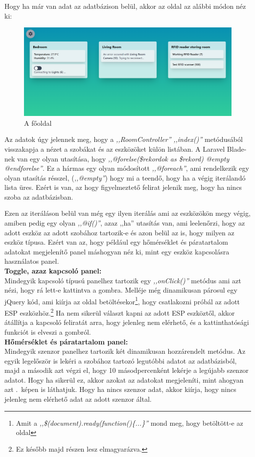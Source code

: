\documentclass[
]{thesis-ekf}
\theoremstyle{definition}
\theoremstyle{remark}
\begin{document}
	Hogy ha már van adat az adatbázison belül, akkor az oldal az alábbi módon néz ki:
	\begin{figure}[ht!]
		\centering
		\includegraphics[width=1\textwidth]{./src/pages_img/index}
		\caption{A főoldal}
		\label{index-page}
	\end{figure}	

	Az adatok úgy jelennek meg, hogy a \emph{,,RoomController''} \emph{,,index()''} metódusából visszakapja a nézet a szobákat és az eszközöket külön listában. A Laravel Blade-nek van egy olyan utasítása, hogy \emph{,,@forelse(\$rekordok as \$rekord) @empty @endforelse''}. Ez a hármas egy olyan módosított \emph{,,@foreach''}, ami rendelkezik egy olyan utasítás résszel, (\emph{,,@empty''}) hogy mi a teendő, hogy ha a végig iterálandó lista üres.
	Ezért is van, az hogy figyelmeztető felirat jelenik meg, hogy ha nincs szoba az adatbázisban.
	
	Ezen az iteráláson belül van még egy ilyen iterálás ami az eszközökön megy végig, amiben pedig egy olyan \emph{,,@if()''}, azaz ,,ha'' utasítás van, ami leelenőrzi, hogy az adott eszköz az adott szobához tartozik-e és azon belül az is, hogy milyen az eszköz típusa. Ezért van az, hogy például egy hőmérséklet és páratartalom adatokat megjelenítő panel máshogyan néz ki, mint egy eszköz kapcsolásra használatos panel.
	\\
	\textbf{Toggle, azaz kapcsoló panel:}
	\\
	Mindegyik kapcsoló típusú panelhez tartozik egy \emph{,,onClick()''} metódus ami azt nézi, hogy rá lett-e kattintva a gombra. Melléje még dinamikusan párosul egy jQuery kód, ami kiírja az oldal betöltésekor\footnote{\label{document-ready} Amit a \emph{,,\$(document).ready(function()\{...\}''} mond meg, hogy betöltött-e az oldal}, hogy csatlakozni próbál az adott ESP eszközhöz.\footnote{Ez később majd  részen lesz elmagyarázva.} Ha nem sikerül választ kapni az adott ESP eszköztől, akkor átállítja a kapcsoló feliratát arra, hogy jelenleg nem elérhető, és a kattinthatósági funkciót is elveszi a gombról.
	\\
	\textbf{Hőmérséklet és páratartalom panel:}
	\\
	Mindegyik szenzor panelhez tartozik két dinamikusan hozzárendelt metódus. Az egyik legelőször is lekéri a szobához tartozó legutóbbi adatot az adatbázisból, majd a második azt végzi el, hogy 10 másodpercenként lekérje a legújabb szenzor adatot. Hogy ha sikerül ez, akkor azokat az adatokat megjeleníti, mint ahogyan azt .~képen is láthatjuk. Hogy ha nincs szenzor adat, akkor kiírja, hogy nincs jelenleg nem elérhető adat az adott szenzor által.
	
\end{document}
